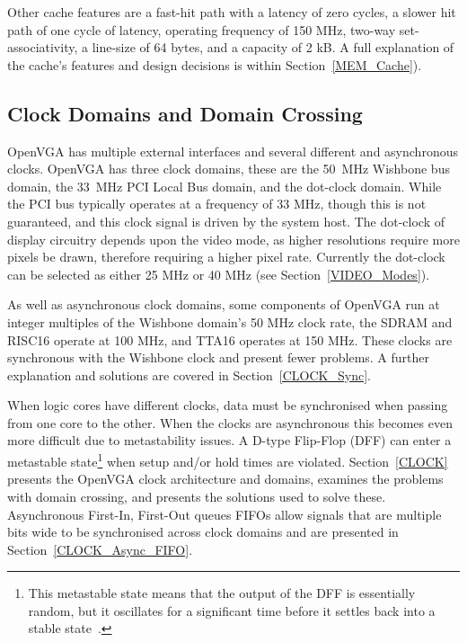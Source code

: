 Other cache features are a fast-hit path with a latency of zero cycles, a slower
hit path of one cycle of latency, operating frequency of 150 MHz, two-way
set-associativity, a line-size of 64 bytes, and a capacity of 2 kB. A full
explanation of the cache's features and design decisions is within
Section~\ref{MEM_Cache}).


\subsection{Clock Domains and Domain Crossing}
OpenVGA has multiple external interfaces and several different and asynchronous
clocks. OpenVGA has three clock domains, these are the 50~MHz Wishbone bus
domain, the 33~MHz PCI Local Bus domain, and the dot-clock domain. While the PCI
bus typically operates at a frequency of 33 MHz, though this is not guaranteed,
and this clock signal is driven by the system host. The dot-clock of display
circuitry depends upon the video mode, as higher resolutions require more pixels
be drawn, therefore requiring a higher pixel rate. Currently the dot-clock can be
selected as either 25 MHz or 40 MHz (see Section~\ref{VIDEO_Modes}).

As well as asynchronous clock domains, some components of OpenVGA run at integer
multiples of the Wishbone domain's 50 MHz clock rate, the SDRAM and RISC16
operate at 100 MHz, and TTA16 operates at 150 MHz. These clocks are synchronous
with the Wishbone clock and present fewer problems. A further explanation and
solutions are covered in Section~\ref{CLOCK_Sync}.

When logic cores have different clocks, data must be synchronised when passing
from one core to the other. When the clocks are asynchronous this becomes even
more difficult due to metastability issues. A D-type
Flip-Flop (DFF) can enter a
metastable state\footnote{This metastable state means that the output of the DFF
is essentially random, but it oscillates for a significant time before it settles
back into a stable state~\cite{Async_FIFO2}.} when setup and/or hold times are
violated. Section~\ref{CLOCK} presents the OpenVGA clock architecture and
domains, examines the problems with domain crossing, and presents the solutions
used to solve these. Asynchronous First-In, First-Out
queues FIFOs allow
signals that are multiple bits wide to be synchronised across clock domains and
are presented in Section~\ref{CLOCK_Async_FIFO}.


